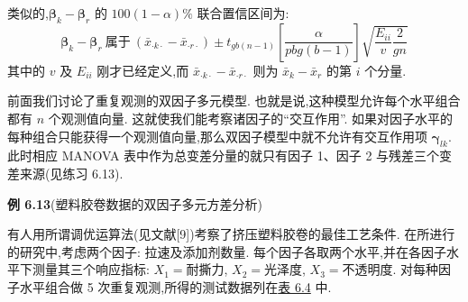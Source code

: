 类似的,$\boldsymbol{\beta}_k-\boldsymbol{\beta}_r$ 的 $100(1-\alpha)\%$ 联合置信区间为:
\label{eq:6-71}
\begin{equation}
\boldsymbol{\beta}_k-\boldsymbol{\beta}_r\ \text{属于}\ (\bar{x}_{\cdot k\cdot}-\bar{x}_{\cdot r\cdot})\pm t_{gb(n-1)}\left[\frac{\alpha}{pbg(b-1)}\right]\sqrt{\frac{E_{ii}}{v}\frac{2}{gn}}
\tag{6-71}
\end{equation}
其中的 $v$ 及 $E_{ii}$ 刚才已经定义,而 $\bar{x}_{\cdot k\cdot}-\bar{x}_{\cdot r\cdot}$ 则为 $\bar{x}_k-\bar{x}_r$ 的第 $i$ 个分量.

\quad 前面我们讨论了重复观测的双因子多元模型. 也就是说,这种模型允许每个水平组合都有 $n$ 个观测值向量. 这就使我们能考察诸因子的“交互作用”. 如果对因子水平的每种组合只能获得一个观测值向量,那么双因子模型中就不允许有交互作用项 $\boldsymbol{\gamma}_{lk}$. 此时相应 MANOVA 表中作为总变差分量的就只有因子 1、因子 2 与残差三个变差来源(见练习 6.13).

\noindent\textbf{例 6.13}\quad (塑料胶卷数据的双因子多元方差分析)

有人用所谓调优运算法(见文献[9])考察了挤压塑料胶卷的最佳工艺条件. 在所进行的研究中,考虑两个因子: 拉速及添加剂数量. 每个因子各取两个水平,并在各因子水平下测量其三个响应指标: $X_1=$耐撕力, $X_2=$光泽度, $X_3=$不透明度. 对每种因子水平组合做 5 次重复观测,所得的测试数据列在\hyperref[tab:6.4]{表 6.4} 中.
